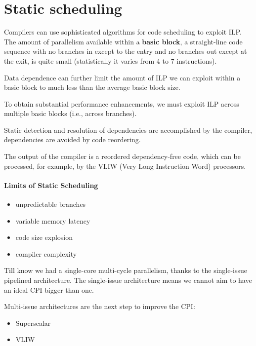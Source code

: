 
\section{Static scheduling}\label{sec:static-scheduling}
Compilers can use sophisticated algorithms for code
scheduling to exploit ILP\@.
The amount of parallelism available within a \textbf{basic block}, a straight-line code sequence with no branches in
except to the entry and no branches out except at the
exit, is quite small (statistically it varies from 4 to 7 instructions).

Data dependence can further limit the amount of ILP we
can exploit within a basic block to much less than the
average basic block size.

To obtain substantial performance enhancements, we
must exploit ILP across multiple basic blocks (i.e.,
across branches).

Static detection and resolution of dependencies are accomplished by the compiler, dependencies are avoided by code
reordering.

The output of the compiler is a reordered dependency-free code, which can be processed, for example, by the VLIW (Very
Long Instruction Word) processors.

\paragraph{Limits of Static Scheduling}
\begin{itemize}
    \item unpredictable branches
    \item variable memory latency
    \item code size explosion
    \item compiler complexity
\end{itemize}

Till know we had a single-core multi-cycle parallelism, thanks to the single-issue pipelined architecture.
The single-issue architecture means we cannot aim to have an ideal CPI bigger than one.

Multi-issue architectures are the next step to improve the CPI:
\begin{itemize}
    \item Superscalar
    \item VLIW
\end{itemize}

